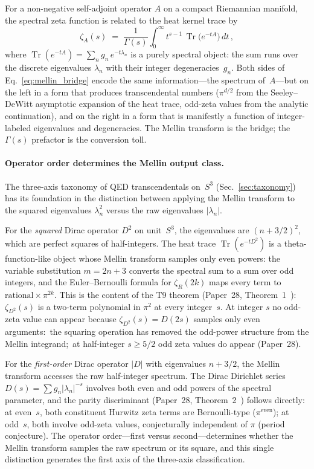\documentclass[aps,pra,twocolumn,superscriptaddress,longbibliography]{revtex4-2}
\begin{document}
For a non-negative self-adjoint operator $A$ on a compact Riemannian
manifold, the spectral zeta function is related to the heat kernel trace
by~\cite{seeley1967,minakshisundaram1949}
\begin{equation}\label{eq:mellin_bridge}
  \zeta_A(s) \;=\; \frac{1}{\Gamma(s)} \int_0^\infty t^{s-1}\,
  \operatorname{Tr}\bigl(e^{-tA}\bigr)\,dt\,,
\end{equation}
where $\operatorname{Tr}(e^{-tA}) = \sum_n g_n\,e^{-t\lambda_n}$ is a
purely spectral object: the sum runs over the discrete eigenvalues
$\lambda_n$ with their integer degeneracies~$g_n$.  Both sides of
Eq.~\eqref{eq:mellin_bridge} encode the same information---the spectrum
of~$A$---but on the left in a form that produces transcendental numbers
($\pi^{d/2}$ from the Seeley--DeWitt asymptotic expansion of the heat
trace, odd-zeta values from the analytic continuation), and on the right
in a form that is manifestly a function of integer-labeled eigenvalues
and degeneracies.  The Mellin transform is the bridge; the $\Gamma(s)$
prefactor is the conversion toll.

\paragraph{Operator order determines the Mellin output class.}
The three-axis taxonomy of QED transcendentals on~$S^3$
(Sec.~\ref{sec:taxonomy}) has its foundation in the distinction between
applying the Mellin transform to the squared eigenvalues $\lambda_n^2$
versus the raw eigenvalues $|\lambda_n|$.

For the \emph{squared} Dirac operator $D^2$ on unit~$S^3$, the
eigenvalues are $(n + 3/2)^2$, which are perfect squares of half-integers.
The heat trace $\operatorname{Tr}(e^{-tD^2})$ is a theta-function-like
object whose Mellin transform samples only even powers: the variable
substitution $m = 2n+3$ converts the spectral sum to a sum over odd
integers, and the Euler--Bernoulli formula for $\zeta_R(2k)$ maps every
term to $\text{rational} \times \pi^{2k}$.  This is the content of the
T9 theorem (Paper~28, Theorem~1~\cite{loutey_paper28}):
$\zeta_{D^2}(s)$ is a two-term polynomial in $\pi^2$ at every
integer~$s$.  At integer $s$ no odd-zeta value can appear because
$\zeta_{D^2}(s) = D(2s)$ samples only even arguments:\ the squaring
operation has removed the odd-power structure from the Mellin
integrand;\ at half-integer $s \ge 5/2$ odd zeta values do appear
(Paper~28).

For the \emph{first-order} Dirac operator $|D|$ with eigenvalues
$n + 3/2$, the Mellin transform accesses the raw half-integer spectrum.
The Dirac Dirichlet series $D(s) = \sum g_n |\lambda_n|^{-s}$ involves
both even and odd powers of the spectral parameter, and the parity
discriminant (Paper~28, Theorem~2~\cite{loutey_paper28}) follows
directly: at even~$s$, both constituent Hurwitz zeta terms are
Bernoulli-type ($\pi^{\text{even}}$); at odd~$s$, both involve
odd-zeta values, conjecturally independent of $\pi$ (period
conjecture).  The operator order---first
versus second---determines whether the Mellin transform samples the
raw spectrum or its square, and this single distinction generates the
first axis of the three-axis classification.
\end{document}

